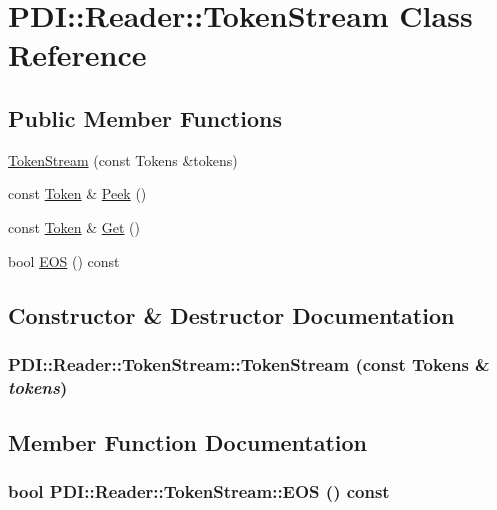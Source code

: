 \hypertarget{class_p_d_i_1_1_reader_1_1_token_stream}{
\section{PDI::Reader::TokenStream Class Reference}
\label{class_p_d_i_1_1_reader_1_1_token_stream}
}
\subsection*{Public Member Functions}
\begin{CompactItemize}
\item 
\hyperlink{class_p_d_i_1_1_reader_1_1_token_stream_5b81fd7e588090835630c1a985e81441}{TokenStream} (const Tokens \&tokens)
\item 
const \hyperlink{struct_p_d_i_1_1_reader_1_1_token}{Token} \& \hyperlink{class_p_d_i_1_1_reader_1_1_token_stream_b23d96c6997875a44efd695206663577}{Peek} ()
\item 
const \hyperlink{struct_p_d_i_1_1_reader_1_1_token}{Token} \& \hyperlink{class_p_d_i_1_1_reader_1_1_token_stream_99575408138c02f46c02fc84ef843526}{Get} ()
\item 
bool \hyperlink{class_p_d_i_1_1_reader_1_1_token_stream_bdda445e5599c1bdb266b7121e72adcb}{EOS} () const 
\end{CompactItemize}


\subsection{Constructor \& Destructor Documentation}
\hypertarget{class_p_d_i_1_1_reader_1_1_token_stream_5b81fd7e588090835630c1a985e81441}{
\subsubsection[{TokenStream}]{\setlength{\rightskip}{0pt plus 5cm}PDI::Reader::TokenStream::TokenStream (const Tokens \& {\em tokens})}}
\label{class_p_d_i_1_1_reader_1_1_token_stream_5b81fd7e588090835630c1a985e81441}




\subsection{Member Function Documentation}
\hypertarget{class_p_d_i_1_1_reader_1_1_token_stream_bdda445e5599c1bdb266b7121e72adcb}{
\subsubsection[{EOS}]{\setlength{\rightskip}{0pt plus 5cm}bool PDI::Reader::TokenStream::EOS () const}}
\label{class_p_d_i_1_1_reader_1_1_token_stream_bdda445e5599c1bdb266b7121e72adcb}


